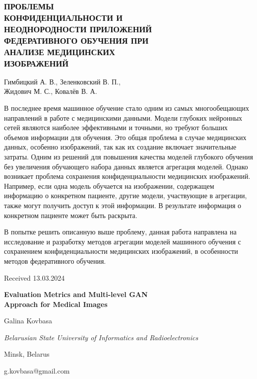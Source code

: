 \documentclass[twocolumn, 10pt]{article}
\begin{document}
\begin{center}
\subsubsection*{\textbf{ПРОБЛЕМЫ \\ КОНФИДЕНЦИАЛЬНОСТИ И \\ НЕОДНОРОДНОСТИ ПРИЛОЖЕНИЙ \\ ФЕДЕРАТИВНОГО ОБУЧЕНИЯ ПРИ \\ АНАЛИЗЕ МЕДИЦИНСКИХ \\ ИЗОБРАЖЕНИЙ}}
\footnotesize{Гимбицкий А. В., Зеленковский В. П., \\ Жидович М. С., Ковалёв В. А.}
\end{center}

В последнее время машинное обучение стало одним
из самых многообещающих направлений в работе с
медицинскими данными. Модели глубоких нейронных
сетей являются наиболее эффективными и точными,
но требуют больших объемов информации для обучения. Это общая проблема в случае медицинских
данных, особенно изображений, так как их создание
включает значительные затраты. Одним из решений
для повышения качества моделей глубокого обучения
без увеличения обучающего набора данных является агрегация моделей. Однако возникает проблема
сохранения конфиденциальности медицинских изображений. Например, если одна модель обучается на
изображении, содержащем информацию о конкретном
пациенте, другие модели, участвующие в агрегации,
также могут получить доступ к этой информации. В
результате информация о конкретном пациенте может
быть раскрыта.

В попытке решить описанную выше проблему, данная работа направлена на исследование и разработку
методов агрегации моделей машинного обучения с
сохранением конфиденциальности медицинских изображений, в особенности методов федеративного обучения.

\hfill{Received 13.03.2024} %
\begin{onecolumn}
\begin{center}
    \fontsize{22}{30}\selectfont
    {\textbf{Evaluation Metrics and Multi-level GAN \\ Approach for Medical Images}}
\end{center}
\begin{center}  
    Galina Kovbasa
    
    \textit{Belarusian State University of Informatics and Radioelectronics}

    Minsk, Belarus

    g.kovbasa@gmail.com

\end{center}
\end{onecolumn}
\end{document}
